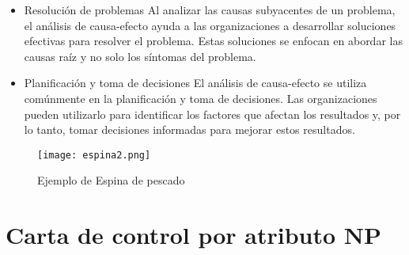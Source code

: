 \documentclass{article}
\theoremstyle{mytheoremstyle}
\theoremstyle{mytheoremstyle}
\theoremstyle{myproblemstyle}
\begin{document}
\begin{enumerate}
\begin{itemize}
				\item Resolución de problemas\newline
				Al analizar las causas subyacentes de un problema, el análisis de causa-efecto ayuda a las organizaciones a desarrollar soluciones efectivas para resolver el problema. Estas soluciones se enfocan en abordar las causas raíz y no solo los síntomas del problema.
				\item Planiﬁcación y toma de decisiones\newline
				El análisis de causa-efecto se utiliza comúnmente en la planiﬁcación y toma de decisiones. Las organizaciones pueden utilizarlo para identiﬁcar los factores que afectan los resultados y, por lo tanto, tomar decisiones informadas para mejorar estos resultados.
			\end{itemize}
			\begin{figure}[H]
				\centering
				\texttt{[image: espina2.png]}
				\caption{Ejemplo de Espina de pescado}
				\label{fig:imagen2}
			\end{figure}
			\newpage

\section{Carta de control por atributo NP}


\end{enumerate}
\end{document}
